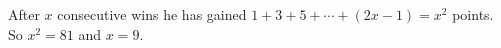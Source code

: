 After $x$ consecutive wins he has gained $1+3+5+\cdots+(2x-1)=x^2$ points. So $x^2=81$ and $x=\boxed{9}$.
